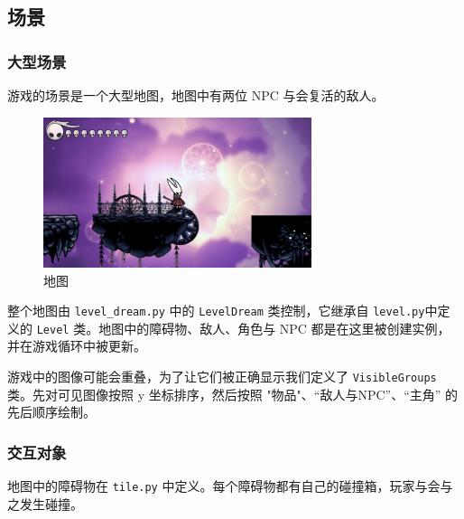 \documentclass[12pt, twoside, a4paper]{article}
\newcommand{\inlinecode}[1]{\setlength{\fboxsep}{0.8mm} \colorbox{lightgray!40}{\texttt{#1}}}
\begin{document}
\subsection{场景}

\subsubsection{大型场景}

游戏的场景是一个大型地图，地图中有两位 NPC 与会复活的敌人。

\begin{figure}[h!]
    \centering
    \includegraphics[width=0.7\textwidth]{assets/report/world.png}
    \caption{地图}
\end{figure}

整个地图由 \inlinecode{level\_dream.py} 中的 \inlinecode{LevelDream} 类控制，它继承自 \inlinecode{level.py}中定义的 \inlinecode{Level} 类。地图中的障碍物、敌人、角色与 NPC 都是在这里被创建实例，并在游戏循环中被更新。

游戏中的图像可能会重叠，为了让它们被正确显示我们定义了 \inlinecode{VisibleGroups} 类。先对可见图像按照 y 坐标排序，然后按照 "物品"、“敌人与NPC”、“主角” 的先后顺序绘制。

\subsubsection{交互对象}

地图中的障碍物在 \inlinecode{tile.py} 中定义。每个障碍物都有自己的碰撞箱，玩家与会与之发生碰撞。
\end{document}
